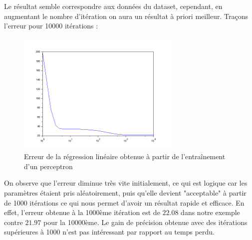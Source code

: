             Le résultat semble correspondre aux données du dataset, cependant, en augmentant le nombre d'itération on aura un résultat à priori meilleur.
            Traçons l'erreur pour 10000 itérations :
            \begin{figure}[H]
              \centering
                \includegraphics[width=0.7\textwidth]{images/perceptron_lineaire_erreur.png}
              \caption{Erreur de la régression linéaire obtenue à partir de l'entraînement d'un perceptron}
              \label{fig:rn3}
            \end{figure}
        On observe que l'erreur diminue très vite initialement, ce qui est logique car les paramètres étaient pris aléatoirement, puis qu'elle devient "acceptable" à partir de 1000 itérations ce qui nous permet d'avoir un résultat rapide et efficace. En effet, l'erreur obtenue à la 1000ème itération est de $22.08$ dans notre exemple contre $21.97$ pour la 10000ème. Le gain de précision obtenue avec des itérations supérieures à 1000 n'est pas intéressant par rapport au temps perdu.
